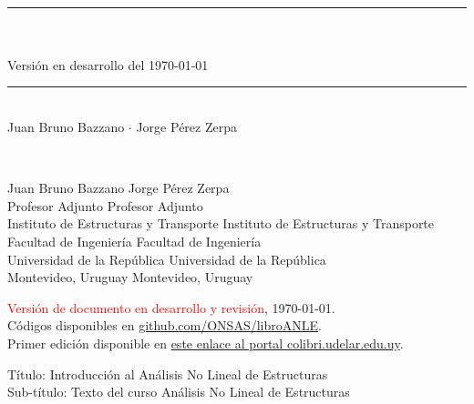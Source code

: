 \documentclass[spanish,twoside,openright,10pt]{book}
\begin{document}
\frontmatter

\begin{titlepage}

~
\vspace{2cm}

\doublespacing
  \noindent
\textcolor{miblue}{        \rule{\linewidth}{0.4mm}} \\[0.2cm]
  \\[0.3cm]
                {\large\sffamily Versión en desarrollo del \today}\\
\textcolor{miblue}{\rule{\linewidth}{.4mm}} \\[0.2cm]
{\large\sffamily  Juan Bruno Bazzano  $\cdot$ Jorge Pérez Zerpa}

\end{titlepage}

~
\vspace{5mm}
\singlespacing

  \noindent
{\sffamily Juan Bruno Bazzano \hfill Jorge Pérez Zerpa\\
	{\footnotesize 	Profesor Adjunto \hfill Profesor Adjunto\\
		Instituto de Estructuras y Transporte  \hfill Instituto de Estructuras y Transporte\\
		Facultad de Ingeniería \hfill Facultad de Ingeniería\\
		Universidad de la República \hfill Universidad de la República\\
		Montevideo, Uruguay \hfill Montevideo, Uruguay}}\\[0.5cm]

\vspace{20mm}

\noindent
\textcolor{red}{
Versión de documento en desarrollo y revisión}, \today.\\
Códigos disponibles en \href{https://github.com/ONSAS/libroANLE}{github.com/ONSAS/libroANLE}.\\[1cm]

\noindent
Primer edición disponible en 
\href{https://www.colibri.udelar.edu.uy/jspui/bitstream/20.500.12008/22106/1/Bazzano_P%c3%a9rezZerpa_Introducci%c3%b3n_al_An%c3%a1lisis_No_Lineal_de_Estructuras_2017.pdf}{este enlace al portal colibri.udelar.edu.uy}.

\noindent
Título: Introducción al Análisis No Lineal de Estructuras\\
\noindent
Sub-título: Texto del curso Análisis No Lineal de Estructuras\\[-2mm]
\end{document}
